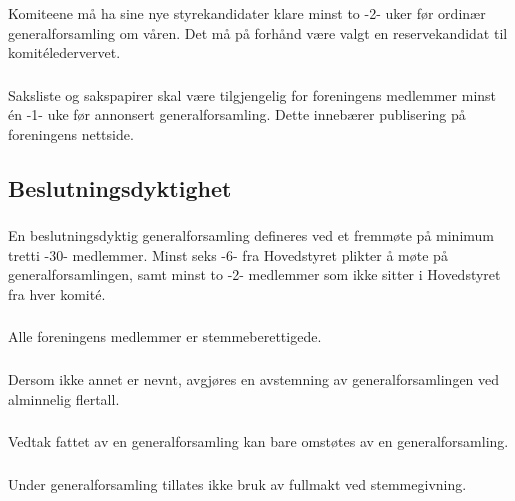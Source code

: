 \subsubsection{}
Komiteene må ha sine nye styrekandidater klare minst to -2- uker før ordinær
generalforsamling om våren. Det må på forhånd være valgt en reservekandidat til
komitéledervervet.

\subsubsection{}
Saksliste og sakspapirer skal være tilgjengelig for foreningens medlemmer minst
én -1- uke før annonsert generalforsamling. Dette innebærer publisering på
foreningens nettside.


\subsection{Beslutningsdyktighet}
\subsubsection{}
En beslutningsdyktig generalforsamling defineres ved et fremmøte på minimum
tretti -30- medlemmer. Minst seks -6- fra Hovedstyret plikter å møte på
generalforsamlingen, samt minst to -2- medlemmer som ikke sitter i Hovedstyret
fra hver komité.

\subsubsection{}
Alle foreningens medlemmer er stemmeberettigede.

\subsubsection{}
Dersom ikke annet er nevnt, avgjøres en avstemning av generalforsamlingen ved
alminnelig flertall.

\subsubsection{}
Vedtak fattet av en generalforsamling kan bare omstøtes av en generalforsamling.

\subsubsection{}
Under generalforsamling tillates ikke bruk av fullmakt ved stemmegivning.

